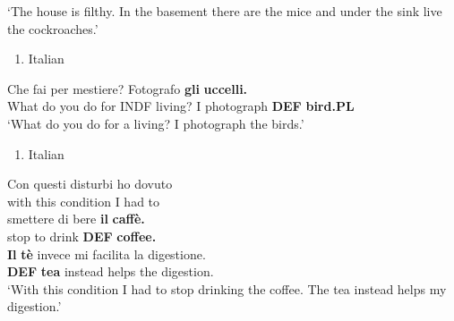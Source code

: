 ‘The house is filthy. In the basement there are the mice and under the sink live the cockroaches.’  
\z


\begin{enumerate} %
\item 
Italian

\end{enumerate} %
\ea\label{}
\gll Che  fai  per  mestiere?  Fotografo  \textbf{gli}\textbf{  uccelli.}\\


What do you  do  for  INDF living?  I photograph  \textbf{DEF} \textbf{bird.PL}\\ %


‘What do you do for a living? I photograph the birds.’
\z


\begin{enumerate} %
\item 
Italian

\end{enumerate} %
\ea\label{}
\gll Con  questi  disturbi  ho  dovuto\\


with  this  condition  I  had to\\ %


\ea\label{}
\gll smettere  di  bere  \textbf{il} \textbf{caffè.} \\


stop  to  drink  \textbf{DEF} \textbf{coffee.}\\ %


\ea\label{}
\gll \textbf{Il} \textbf{tè} invece  mi facilita  la digestione.\\


\textbf{DEF} \textbf{tea} instead  helps  the digestion.\\ %


‘With this condition I had to stop drinking the coffee. The tea instead helps my digestion.’
\z

